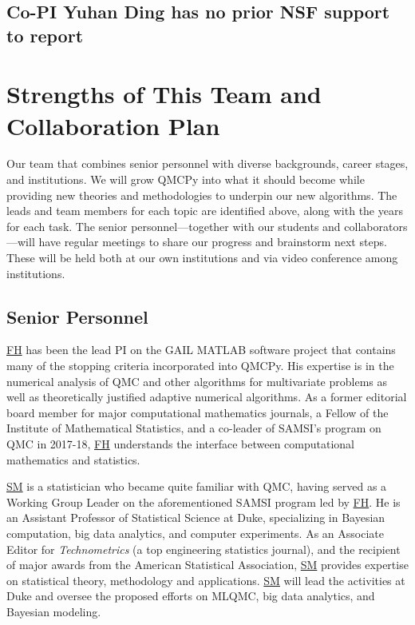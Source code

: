 \documentclass[11pt]{NSFamsart}
\newcommand{\cmtS}[1]{{\color{blue}{(Simon: #1)}}}
\newcommand{\FH}{\hyperlink{FHlink}{FH}\xspace}
\newcommand{\SM}{\hyperlink{SMlink}{SM}\xspace}
\newcommand{\MATLAB}{MATLAB\xspace}
\begin{document}
\subsection{Co-PI Yuhan Ding has no prior NSF support to report}

\section{Strengths of This Team and Collaboration Plan}
\cmtS{May need further thought on DEI, seems to be increasingly important for grants nowadays.} Our team that combines senior personnel with diverse backgrounds, career stages, and institutions.  We will grow QMCPy into what it should become while providing new theories and methodologies to underpin our new algorithms. The leads and team members for each topic are identified above, along with the years for each task.  The senior personnel---together with our students and collaborators---will have regular meetings to share our progress and brainstorm next steps. These will be held both at our own institutions and via video conference among institutions.

\subsection{Senior Personnel}
\FH has been the lead PI on the GAIL \cite{ChoEtal21a} \MATLAB software project that contains many of the stopping criteria incorporated into QMCPy.  His expertise is in the numerical analysis of QMC and other algorithms for multivariate problems as well as theoretically justified adaptive numerical algorithms.  As a former editorial board member for major computational mathematics journals, a Fellow of the Institute of Mathematical Statistics, and a co-leader of SAMSI's program on QMC in 2017-18, \FH understands the interface between computational mathematics and statistics.

\SM is a statistician who became quite familiar with QMC, having served as a Working Group Leader on the aforementioned SAMSI program led by \FH. He is an Assistant Professor of Statistical Science at Duke, specializing in Bayesian computation, big data analytics, and computer experiments. As an Associate Editor for \textit{Technometrics} (a top engineering statistics journal), and the recipient of major awards from the American Statistical Association, \SM provides expertise on statistical theory, methodology and applications. \SM will lead the activities at Duke and oversee the proposed efforts on MLQMC, big data analytics, and Bayesian modeling.
\end{document}
